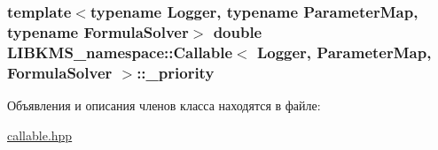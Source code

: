 \hypertarget{classLIBKMS__namespace_1_1Callable_a828e2be381cf907c88054e604a17f5a4}{
\subsubsection[{\-\_\-priority}]{\setlength{\rightskip}{0pt plus 5cm}template$<$typename Logger, typename Parameter\-Map, typename Formula\-Solver$>$ double {\bf L\-I\-B\-K\-M\-S\-\_\-namespace\-::\-Callable}$<$ Logger, Parameter\-Map, Formula\-Solver $>$\-::\-\_\-priority\hspace{0.3cm}{\ttfamily [protected]}}}\label{classLIBKMS__namespace_1_1Callable_a828e2be381cf907c88054e604a17f5a4}


Объявления и описания членов класса находятся в файле\-:\begin{DoxyCompactItemize}
\item 
\hyperlink{callable_8hpp}{callable.\-hpp}\end{DoxyCompactItemize}

